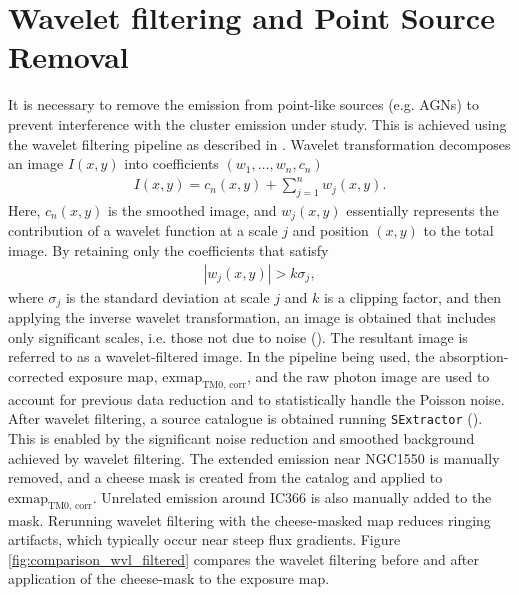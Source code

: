 \section{Wavelet filtering and Point Source Removal}
It is necessary to remove the emission from point-like sources (e.g. AGNs) to prevent interference with the cluster emission under study. This is achieved using the wavelet filtering pipeline as described in \cite{Pacaud2006}. Wavelet transformation decomposes an image \(I(x, y)\) into coefficients \((w_1, \ldots, w_n, c_n)\)
\begin{align*}
I(x, y) = c_n(x, y) + \sum_{j=1}^{n}w_j(x, y).    
\end{align*}
Here, \(c_n(x, y)\) is the smoothed image, and \(w_j(x, y)\) essentially represents the contribution of a wavelet function at a scale \(j\) and position \((x, y)\) to the total image. By retaining only the coefficients that satisfy
\begin{align*}
|w_j(x, y)| > k\sigma_j,
\end{align*}
where \(\sigma_j\) is the standard deviation at scale \(j\) and \(k\) is a clipping factor, and then applying the inverse wavelet transformation, an image is obtained that includes only significant scales, i.e. those not due to noise (\cite{Stark1998}). The resultant image is referred to as a wavelet-filtered image. In the pipeline being used, the absorption-corrected exposure map, \(\text{exmap}_\text{TM0, corr}\), and the raw photon image are used to account for previous data reduction and to statistically handle the Poisson noise. After wavelet filtering, a source catalogue is obtained running \texttt{SExtractor} (\cite{Bertin1996}). This is enabled by the significant noise reduction and smoothed background achieved by wavelet filtering. The extended emission near NGC1550 is manually removed, and a cheese mask is created from the catalog and applied to \(\text{exmap}_\text{TM0, corr}\). Unrelated emission around IC366 is also manually added to the mask. Rerunning wavelet filtering with the cheese-masked map reduces ringing artifacts, which typically occur near steep flux gradients. Figure \ref{fig:comparison_wvl_filtered} compares the wavelet filtering before and after application of the cheese-mask to the exposure map.
%
